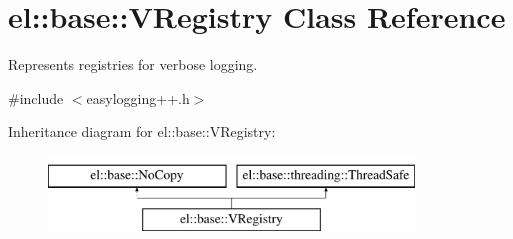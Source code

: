 \hypertarget{classel_1_1base_1_1VRegistry}{\section{el\-:\-:base\-:\-:V\-Registry Class Reference}
\label{classel_1_1base_1_1VRegistry}
}


Represents registries for verbose logging.  




{\ttfamily \#include $<$easylogging++.\-h$>$}

Inheritance diagram for el\-:\-:base\-:\-:V\-Registry\-:\begin{figure}[H]
\begin{center}
\leavevmode
\includegraphics[height=2.000000cm]{classel_1_1base_1_1VRegistry}
\end{center}
\end{figure}
